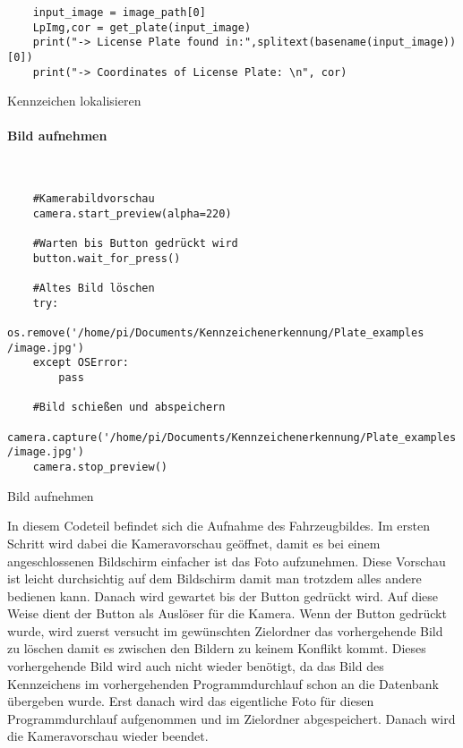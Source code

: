 \begin{listing}[H]
    \begin{verbatim}
    input_image = image_path[0]
    LpImg,cor = get_plate(input_image)
    print("-> License Plate found in:",splitext(basename(input_image))[0])
    print("-> Coordinates of License Plate: \n", cor)
    \end{verbatim}
    \caption{Kennzeichen lokalisieren}
\end{listing}

\paragraph{Bild aufnehmen}\mbox{}\\

\begin{longlisting}
    \begin{verbatim}
    #Kamerabildvorschau
    camera.start_preview(alpha=220)

    #Warten bis Button gedrückt wird
    button.wait_for_press()

    #Altes Bild löschen
    try:
        os.remove('/home/pi/Documents/Kennzeichenerkennung/Plate_examples /image.jpg')
    except OSError:
        pass

    #Bild schießen und abspeichern 
    camera.capture('/home/pi/Documents/Kennzeichenerkennung/Plate_examples /image.jpg')
    camera.stop_preview()
    \end{verbatim}
    \caption{Bild aufnehmen}
\end{longlisting}

In diesem Codeteil befindet sich die Aufnahme des Fahrzeugbildes. Im ersten Schritt wird dabei die Kameravorschau geöffnet, damit es 
bei einem angeschlossenen Bildschirm einfacher ist das Foto aufzunehmen. Diese Vorschau ist leicht durchsichtig auf dem Bildschirm 
damit man trotzdem alles andere bedienen kann. Danach wird gewartet bis der Button gedrückt wird. Auf diese Weise dient der Button als 
Auslöser für die Kamera. Wenn der Button gedrückt wurde, wird zuerst versucht im gewünschten Zielordner das vorhergehende Bild zu löschen 
damit es zwischen den Bildern zu keinem Konflikt kommt. Dieses vorhergehende Bild wird auch nicht wieder benötigt, da das Bild des 
Kennzeichens im vorhergehenden Programmdurchlauf schon an die Datenbank übergeben wurde. Erst danach wird das eigentliche Foto für 
diesen Programmdurchlauf aufgenommen und im Zielordner abgespeichert. Danach wird die Kameravorschau wieder beendet.

